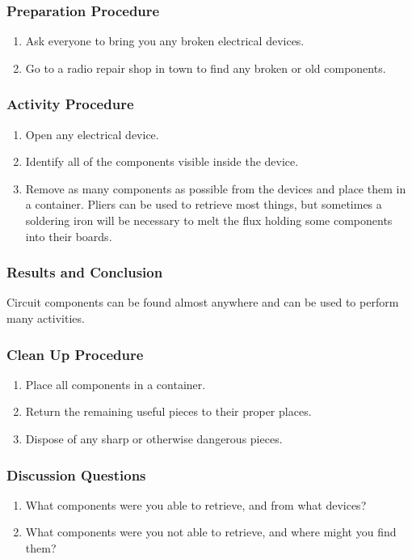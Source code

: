 \subsubsection*{Preparation Procedure}
\begin{enumerate}
\item{Ask everyone to bring you any broken electrical devices.} 
\item{Go to a radio repair shop in town to find any broken or old components.} 
\end{enumerate}

\subsubsection*{Activity Procedure}
\begin{enumerate}
\item{Open any electrical device.} 
\item{Identify all of the components visible inside the device.} 
\item{Remove as many components as possible from the devices and place them in a container. Pliers can be used to retrieve most things, but sometimes a soldering iron will be necessary to melt the flux holding some components into their boards.} 
\end{enumerate}

\subsubsection*{Results and Conclusion}
Circuit components can be found almost anywhere and can be used to perform many activities.

\subsubsection*{Clean Up Procedure}
\begin{enumerate}
\item{Place all components in a container.} 
\item{Return the remaining useful pieces to their proper places.} 
\item{Dispose of any sharp or otherwise dangerous pieces.} 
\end{enumerate}

\subsubsection*{Discussion Questions}
\begin{enumerate}
\item{What components were you able to retrieve, and from what devices?}
\item{What components were you not able to retrieve, and where might you find them?}
\end{enumerate}

